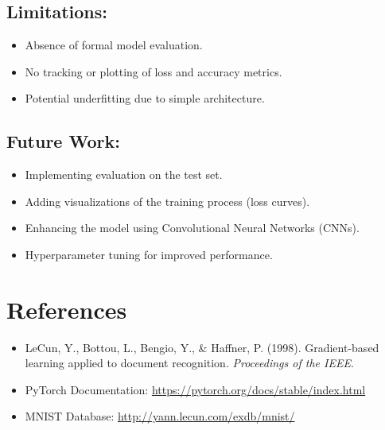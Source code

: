 \documentclass{article}
\begin{document}
\subsection*{Limitations:}
\begin{itemize}
    \item Absence of formal model evaluation.
    \item No tracking or plotting of loss and accuracy metrics.
    \item Potential underfitting due to simple architecture.
\end{itemize}

\subsection*{Future Work:}
\begin{itemize}
    \item Implementing evaluation on the test set.
    \item Adding visualizations of the training process (loss curves).
    \item Enhancing the model using Convolutional Neural Networks (CNNs).
    \item Hyperparameter tuning for improved performance.
\end{itemize}

\section{References}
\begin{itemize}
    \item LeCun, Y., Bottou, L., Bengio, Y., \& Haffner, P. (1998). Gradient-based learning applied to document recognition. \textit{Proceedings of the IEEE}.
    \item PyTorch Documentation: \url{https://pytorch.org/docs/stable/index.html}
    \item MNIST Database: \url{http://yann.lecun.com/exdb/mnist/}
\end{itemize}
\end{document}
